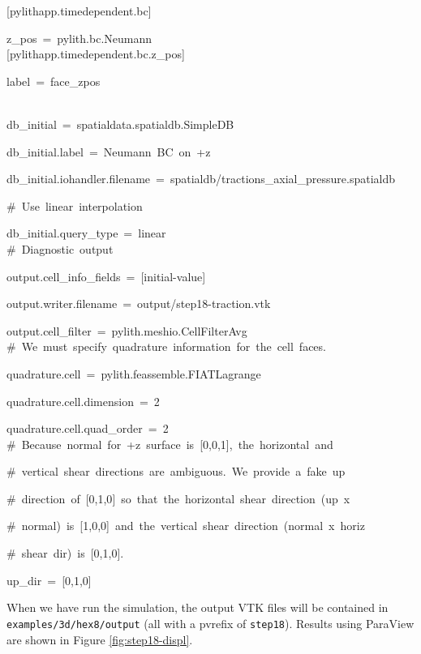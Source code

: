 \begin{lyxcode}
{[}pylithapp.timedependent.bc{]}

z\_pos~=~pylith.bc.Neumann~\\


{[}pylithapp.timedependent.bc.z\_pos{]}

label~=~face\_zpos

~\\
db\_initial~=~spatialdata.spatialdb.SimpleDB

db\_initial.label~=~Neumann~BC~on~+z

db\_initial.iohandler.filename~=~spatialdb/tractions\_axial\_pressure.spatialdb

\#~Use~linear~interpolation

db\_initial.query\_type~=~linear~\\


\#~Diagnostic~output

output.cell\_info\_fields~=~{[}initial-value{]}

output.writer.filename~=~output/step18-traction.vtk

output.cell\_filter~=~pylith.meshio.CellFilterAvg~\\


\#~We~must~specify~quadrature~information~for~the~cell~faces.

quadrature.cell~=~pylith.feassemble.FIATLagrange

quadrature.cell.dimension~=~2

quadrature.cell.quad\_order~=~2~\\


\#~Because~normal~for~+z~surface~is~{[}0,0,1{]},~the~horizontal~and

\#~vertical~shear~directions~are~ambiguous.~We~provide~a~\textquotedbl{}fake\textquotedbl{}~up

\#~direction~of~{[}0,1,0{]}~so~that~the~horizontal~shear~direction~(\textquotedbl{}up\textquotedbl{}~x

\#~normal)~is~{[}1,0,0{]}~and~the~vertical~shear~direction~(normal~x~horiz

\#~shear~dir)~is~{[}0,1,0{]}.

up\_dir~=~{[}0,1,0{]}
\end{lyxcode}
When we have run the simulation, the output VTK files will be contained
in \texttt{examples/3d/hex8/output} (all with a pvrefix of \texttt{step18}).
Results using ParaView are shown in Figure \vref{fig:step18-displ}.

